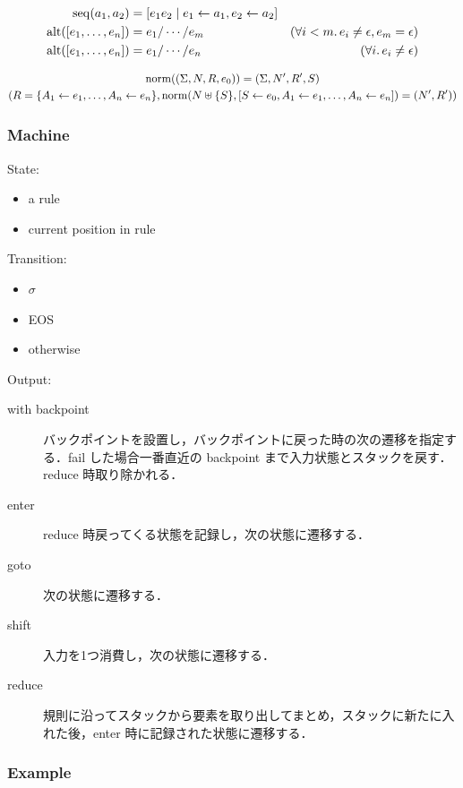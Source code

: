 \begin{align*}
  \mathop{\mathrm{seq}}(a_1, a_2) &= [e_1 e_2 \mid e_1 \gets a_1, e_2 \gets a_2] \\
  \mathop{\mathrm{alt}}([e_1, \ldots, e_n]) &= e_1 / \cdots / e_m &(\forall i < m\ldotp e_i \neq \epsilon, e_m = \epsilon) \\
  \mathop{\mathrm{alt}}([e_1, \ldots, e_n]) &= e_1 / \cdots / e_n &(\forall i\ldotp e_i \neq \epsilon)
\end{align*}

\begin{gather*}
  \mathop{\mathrm{norm}}((\Sigma, N, R, e_0)) = (\Sigma, N', R', S) \\
  (R = \{A_1 \gets e_1, \ldots, A_n \gets e_n\}, \mathop{\mathrm{norm}}(N \uplus \{S\}, [S \gets e_0, A_1 \gets e_1, \ldots, A_n \gets e_n]) = (N', R'))
\end{gather*}

\subsubsection{Machine}

State:
\begin{itemize}
  \item a rule
  \item current position in rule
\end{itemize}

Transition:
\begin{itemize}
  \item $\sigma$
  \item EOS
  \item otherwise
\end{itemize}

Output:
\begin{description}
  \item[with backpoint] バックポイントを設置し，バックポイントに戻った時の次の遷移を指定する．fail した場合一番直近の backpoint まで入力状態とスタックを戻す．reduce 時取り除かれる．
  \item[enter] reduce 時戻ってくる状態を記録し，次の状態に遷移する．
  \item[goto] 次の状態に遷移する．
  \item[shift] 入力を1つ消費し，次の状態に遷移する．
  \item[reduce] 規則に沿ってスタックから要素を取り出してまとめ，スタックに新たに入れた後，enter 時に記録された状態に遷移する．
\end{description}

\subsubsection{Example}

